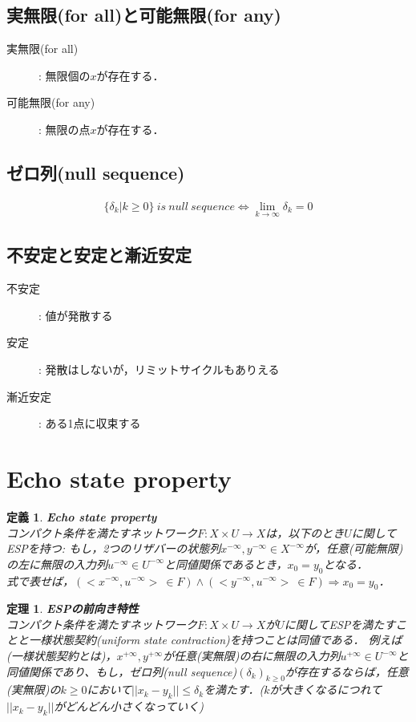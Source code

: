\documentclass[10pt]{jsarticle}
\newtheorem{theo}{定理}[section]
\newtheorem{defi}{定義}[section]
\begin{document}
\subsection{実無限(for all)と可能無限(for any)}
\begin{description}
	\item[実無限(for all)]: 無限個の$x$が存在する．
	\item[可能無限(for any)]: 無限の点$x$が存在する．
\end{description}

\subsection{ゼロ列(null sequence)}
\begin{align}
	\{\delta_k | k\geq 0\}~is~null~sequence \Leftrightarrow \lim_{k\to \infty}\delta_k=0
\end{align}

\subsection{不安定と安定と漸近安定}
\begin{description}
	\item[不安定]: 値が発散する
	\item[安定]: 発散はしないが，リミットサイクルもありえる
	\item[漸近安定]: ある1点に収束する
\end{description}

\section{Echo state property}
\begin{defi}
	\textbf{Echo state property}\\
	コンパクト条件を満たすネットワーク$F:X\times U\rightarrow X$は，以下のとき$U$に関してESPを持つ:
	もし，2つのリザバーの状態列$x^{-\infty},y^{-\infty}\in X^{-\infty}$が，任意(可能無限)の左に無限の入力列$u^{-\infty}\in U^{-\infty}$と同値関係であるとき，$x_0=y_0$となる．\\
	式で表せば，$(<x^{-\infty}, u^{-\infty}>~\in F)\land(<y^{-\infty}, u^{-\infty}>~\in F) \Rightarrow x_0=y_0$．
\end{defi}

\begin{theo}
	\textbf{ESPの前向き特性}\\
	コンパクト条件を満たすネットワーク$F:X\times U\rightarrow X$が$U$に関してESPを満たすことと一様状態契約(uniform state contraction)を持つことは同値である．
	例えば(一様状態契約とは)，$x^{+\infty}, y^{+\infty}$が任意(実無限)の右に無限の入力列$u^{+\infty}\in U^{-\infty}$と同値関係であり、もし，ゼロ列(null sequence)$(\delta_k)_{k\geq 0}$が存在するならば，任意(実無限)の$k\geq 0$において$||x_k-y_k||\leq \delta_k$を満たす．($k$が大きくなるにつれて$||x_k-y_k||$がどんどん小さくなっていく)
	
\end{theo}
\end{document}

